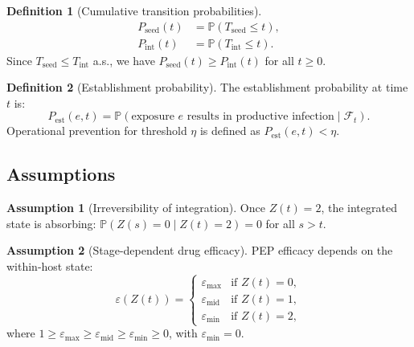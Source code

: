 \documentclass[12pt,a4paper]{article}
\theoremstyle{plain}
\theoremstyle{definition}
\newtheorem{definition}{Definition}
\newtheorem{assumption}{Assumption}
\theoremstyle{remark}
\newcommand{\Pest}{P_{\mathrm{est}}}
\newcommand{\Pint}{P_{\mathrm{int}}}
\newcommand{\Pseed}{P_{\mathrm{seed}}}
\newcommand{\Prob}{\mathbb{P}}
\begin{document}
\begin{definition}[Cumulative transition probabilities]\label{def:S-cumprob}
\begin{align}
    \Pseed(t) &= \Prob(T_{\mathrm{seed}} \leq t), \label{eq:S-Pseed}\\
    \Pint(t) &= \Prob(T_{\mathrm{int}} \leq t). \label{eq:S-Pint}
\end{align}
Since $T_{\mathrm{seed}} \leq T_{\mathrm{int}}$ a.s., we have $\Pseed(t) \geq \Pint(t)$ for all $t \geq 0$.
\end{definition}

\begin{definition}[Establishment probability]\label{def:S-Pest}
The establishment probability at time $t$ is:
\begin{equation}\label{eq:S-Pest}
    \Pest(e,t) = \Prob(\text{exposure } e \text{ results in productive infection} \mid \mathcal{F}_t).
\end{equation}
Operational prevention for threshold $\eta$ is defined as $\Pest(e,t) < \eta$.
\end{definition}


\subsection{Assumptions}\label{sec:S-assumptions}

\begin{assumption}[Irreversibility of integration]\label{S-A1}
Once $Z(t) = 2$, the integrated state is absorbing: $\Prob(Z(s) = 0 \mid Z(t) = 2) = 0$ for all $s > t$.
\end{assumption}

\begin{assumption}[Stage-dependent drug efficacy]\label{S-A2}
PEP efficacy depends on the within-host state:
\begin{equation}\label{eq:S-stage-eff}
    \varepsilon(Z(t)) = \begin{cases}
        \varepsilon_{\max} & \text{if } Z(t) = 0, \\
        \varepsilon_{\mathrm{mid}} & \text{if } Z(t) = 1, \\
        \varepsilon_{\min} & \text{if } Z(t) = 2,
    \end{cases}
\end{equation}
where $1 \geq \varepsilon_{\max} \geq \varepsilon_{\mathrm{mid}} \geq \varepsilon_{\min} \geq 0$, with $\varepsilon_{\min} = 0$.
\end{assumption}
\end{document}
